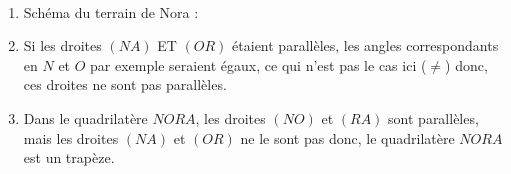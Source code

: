  \begin{corrige}
 \ \\ [-5mm]
    \begin{enumerate}
       \item Schéma du terrain de Nora : \\
       \item Si les droites $(NA)$ ET $(OR)$ étaient parallèles, les angles correspondants en $N$ et $O$ par exemple seraient égaux, ce qui n'est pas le cas ici ($\neq$) donc, {\blue ces droites ne sont pas parallèles}.
       \item Dans le quadrilatère $NORA$, les droites $(NO)$ et $(RA)$ sont parallèles, mais les droites $(NA)$ et $(OR)$ ne le sont pas donc, {\blue le quadrilatère $NORA$ est un trapèze}.   
    \end{enumerate}
 \end{corrige}